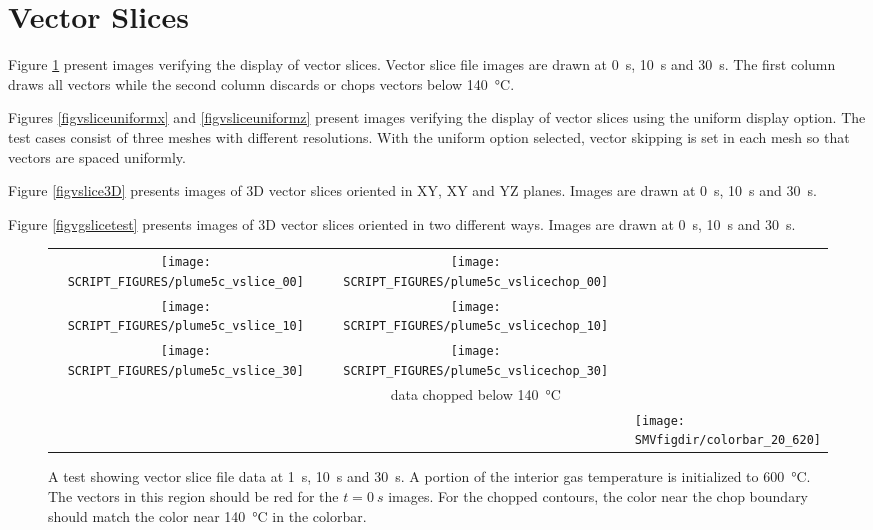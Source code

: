 \documentclass[11pt,twoside]{book}
\newcommand{\feda}{}
\begin{document}
\feda

\clearpage

\section{Vector Slices}
Figure \ref{figvslicetest} present images verifying the display of vector slices.
Vector slice file images are drawn at \SI{0}{s}, \SI{10}{s} and \SI{30}{s}.
The first column draws all vectors while the second column discards or chops vectors
below \SI{140}{\degreeCelsius}.

Figures \ref{figvsliceuniformx} and \ref{figvsliceuniformz} present images verifying the display of vector slices using the uniform display option.
The test cases consist of three meshes with different resolutions.  With the uniform option selected, vector
skipping is set in each mesh so that vectors are spaced uniformly.

Figure \ref{figvslice3D} presents images of 3D vector slices oriented in XY, XY and YZ planes.
Images are drawn at \SI{0}{s}, \SI{10}{s} and \SI{30}{s}.

Figure \ref{figvgslicetest} presents images of 3D vector slices oriented in two different
ways. Images are drawn at \SI{0}{s}, \SI{10}{s} and \SI{30}{s}.



\begin{figure}[bph]
\begin{center}
\begin{tabular}{ccl}
 \texttt{[image: SCRIPT\_FIGURES/plume5c\_vslice\_00]}&
 \texttt{[image: SCRIPT\_FIGURES/plume5c\_vslicechop\_00]}\\
 \texttt{[image: SCRIPT\_FIGURES/plume5c\_vslice\_10]}&
 \texttt{[image: SCRIPT\_FIGURES/plume5c\_vslicechop\_10]}\\
 \texttt{[image: SCRIPT\_FIGURES/plume5c\_vslice\_30]}&
 \texttt{[image: SCRIPT\_FIGURES/plume5c\_vslicechop\_30]}\\
 &data chopped below \SI{140}{\degreeCelsius}\\
 &&\raisebox{0.5in}[0pt]{\texttt{[image: \\SMVfigdir/colorbar\_20\_620]}}\\

 \end{tabular}
\end{center}
 \caption[A test showing vector slice file data] {A test showing vector slice file data
 at \SI{1}{s}, \SI{10}{s} and \SI{30}{s}. A portion of the interior gas temperature
 is initialized to \SI{600}{\degreeCelsius}.  The vectors in this region should be
 red for the $t=\SI{0}{s}$ images. For the chopped contours, the color near the chop
 boundary should match the color near \SI{140}{\degreeCelsius} in the colorbar.}
\label{figvslicetest}%
\end{figure}
\end{document}
